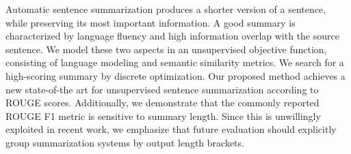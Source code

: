 Automatic sentence summarization produces a shorter version of a sentence, while preserving its most important information. A good summary is characterized by language fluency and high information overlap with the source sentence. We model these two aspects in an unsupervised objective function, consisting of language modeling and semantic similarity metrics. We search for a high-scoring summary by discrete optimization. Our proposed method achieves a new state-of-the art for unsupervised sentence summarization according to ROUGE scores. Additionally, we demonstrate that the commonly reported ROUGE F1 metric is sensitive to summary length. Since this is unwillingly exploited in recent work, we emphasize that future evaluation should explicitly group summarization systems by output length brackets.
